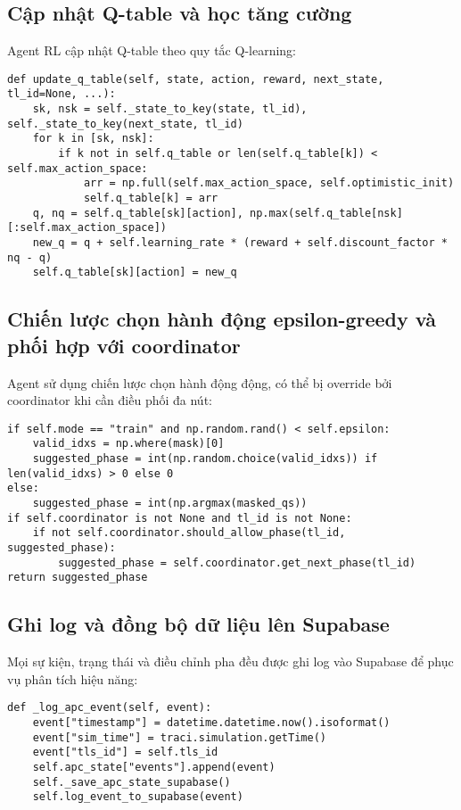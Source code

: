 \subsection{Cập nhật Q-table và học tăng cường}

Agent RL cập nhật Q-table theo quy tắc Q-learning:
\begin{lstlisting}[style=py,caption={Cập nhật Q-table}]
def update_q_table(self, state, action, reward, next_state, tl_id=None, ...):
    sk, nsk = self._state_to_key(state, tl_id), self._state_to_key(next_state, tl_id)
    for k in [sk, nsk]:
        if k not in self.q_table or len(self.q_table[k]) < self.max_action_space:
            arr = np.full(self.max_action_space, self.optimistic_init)
            self.q_table[k] = arr
    q, nq = self.q_table[sk][action], np.max(self.q_table[nsk][:self.max_action_space])
    new_q = q + self.learning_rate * (reward + self.discount_factor * nq - q)
    self.q_table[sk][action] = new_q
\end{lstlisting}

\subsection{Chiến lược chọn hành động epsilon-greedy và phối hợp với coordinator}

Agent sử dụng chiến lược chọn hành động động, có thể bị override bởi coordinator khi cần điều phối đa nút:
\begin{lstlisting}[style=py,caption={Epsilon-greedy và phối hợp coordinator}]
if self.mode == "train" and np.random.rand() < self.epsilon:
    valid_idxs = np.where(mask)[0]
    suggested_phase = int(np.random.choice(valid_idxs)) if len(valid_idxs) > 0 else 0
else:
    suggested_phase = int(np.argmax(masked_qs))
if self.coordinator is not None and tl_id is not None:
    if not self.coordinator.should_allow_phase(tl_id, suggested_phase):
        suggested_phase = self.coordinator.get_next_phase(tl_id)
return suggested_phase
\end{lstlisting}

\subsection{Ghi log và đồng bộ dữ liệu lên Supabase}

Mọi sự kiện, trạng thái và điều chỉnh pha đều được ghi log vào Supabase để phục vụ phân tích hiệu năng:
\begin{lstlisting}[style=py,caption={Ghi log sự kiện vào Supabase}]
def _log_apc_event(self, event):
    event["timestamp"] = datetime.datetime.now().isoformat()
    event["sim_time"] = traci.simulation.getTime()
    event["tls_id"] = self.tls_id
    self.apc_state["events"].append(event)
    self._save_apc_state_supabase()
    self.log_event_to_supabase(event)
\end{lstlisting}

